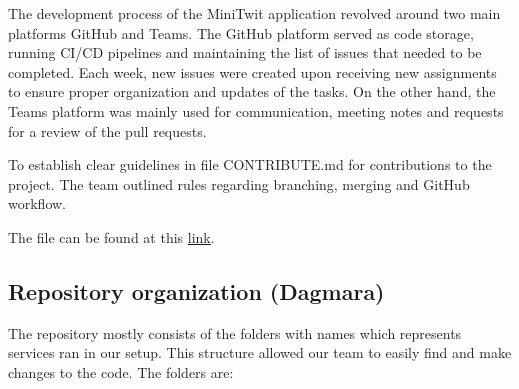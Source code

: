 \documentclass{article}
\begin{document}
\noindent The development process of the MiniTwit application revolved around two main platforms GitHub and Teams. The GitHub platform served as code storage, running CI/CD pipelines and maintaining the list of issues that needed to be completed. Each week, new issues were created upon receiving new assignments to ensure proper organization and updates of the tasks. On the other hand, the Teams platform was mainly used for communication, meeting notes and requests for a review of the pull requests.
\par

\noindent To establish clear guidelines in file CONTRIBUTE.md for contributions to the project. The team outlined rules regarding branching, merging and GitHub workflow. 

The file can be found at this \href{https://github.com/szymongalecki/ITU-MiniTwit/blob/main/CONTRIBUTE.md}{link}.

\subsection{Repository organization (Dagmara)}
The repository mostly consists of the folders with names which represents services ran in our setup. This structure allowed our team to easily find and make changes to the code. The folders are:
\end{document}
